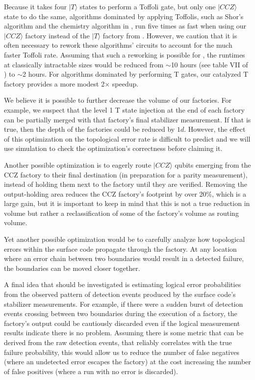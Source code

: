 \documentclass[superscriptaddress,notitlepage,longbibliography]{revtex4-1}
\begin{document}
Because it takes four $|T\rangle$ states to perform a Toffoli gate, but only one $|CCZ\rangle$ state to do the same, algorithms dominated by applying Toffolis, such as Shor's algorithm and the chemistry algorithm in \cite{babbush2018}, run five times as fast when using our $|CCZ\rangle$ factory instead of the $|T\rangle$ factory from \cite{fowler2018}.
However, we caution that it is often necessary to rework these algorithms' circuits to account for the much faster Toffoli rate.
Assuming that such a reworking is possible for \cite{babbush2018}, the runtimes at classically intractable sizes would be reduced from $\sim$10 hours (see table VII of \cite{babbush2018}) to $\sim$2 hours.
For algorithms dominated by performing T gates, our catalyzed T factory provides a more modest 2$\times$ speedup.

We believe it is possible to further decrease the volume of our factories.
For example, we suspect that the level 1 T state injection at the end of each factory can be partially merged with that factory's final stabilizer measurement.
If that is true, then the depth of the factories could be reduced by $1d$.
However, the effect of this optimization on the topological error rate is difficult to predict and we will use simulation to check the optimization's correctness before claiming it.

Another possible optimization is to eagerly route $|CCZ\rangle$ qubits emerging from the CCZ factory to their final destination (in preparation for a parity measurement), instead of holding them next to the factory until they are verified.
Removing the output-holding area reduces the CCZ factory's footprint by over 20\%, which is a large gain, but it is important to keep in mind that this is not a true reduction in volume but rather a reclassification of some of the factory's volume as routing volume.

Yet another possible optimization would be to carefully analyze how topological errors within the surface code propagate through the factory.
At any location where an error chain between two boundaries would result in a detected failure, the boundaries can be moved closer together.

A final idea that should be investigated is estimating logical error probabilities from the observed pattern of detection events produced by the surface code's stabilizer measurements.
For example, if there were a sudden burst of detection events crossing between two boundaries during the execution of a factory, the factory's output could be cautiously discarded even if the logical measurement results indicate there is no problem.
Assuming there is some metric that can be derived from the raw detection events, that reliably correlates with the true failure probability, this would allow us to reduce the number of false negatives (where an undetected error escapes the factory) at the cost increasing the number of false positives (where a run with no error is discarded).
\end{document}
